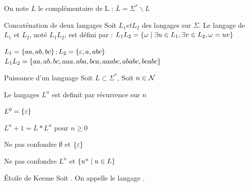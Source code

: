 \documentclass[a4paper,french,bookmarks]{book}
\begin{document}
    \begin{notation}
        On note $\overline{L}$ le complémentaire de L :
        $\overline{L} = \Sigma^* \backslash L$
    \end{notation}
    
    \begin{definition}{Concaténation de deux langages}{}
        Soit $L_1 et L_2$ des langages sur $\Sigma$.
        Le langage   de $L_1$ et $L_2$, noté $L_1 L_2$, est défini par :
        $L_1 L_2 = \left\{\omega \;\middle\vert\; \exists u \in L_1, \exists v \in L_2, \omega = uv\right\}$
    \end{definition}
    
    \begin{example}{}{}
        $L_1 = \left\{aa, ab, bc\right\} ; L_2 = \left\{\varepsilon, a, abc\right\}$
        $L_1 L_2 = \left\{aa, ab, bc, aaa, aba, bca, aaabc, ababc, bcabc\right\}$
    \end{example}
    
    \begin{definition}{Puissance d'un language }
        Soit $L \subset \Sigma^*$, Soit $n\in \mathcal{N}$  
        
        
        Le langages $L^n$ est definit par récurrence sur $n$
        \begin{enumerate}{}{}
            
            \itt $L^0 = \left\{ \varepsilon\right\}$
            
            \itt %
                $L^n+1 = L * L^n $ pour $n \geq 0$ 
                
        \end{enumerate}{}
        
    \end{definition}
    
    \begin{warning}{}{}
        \begin{enumerate}
            \itast Ne pas confondre $\emptyset$ et $\left\{\varepsilon\right\}$
            
            \itast Ne pas confondre $L^n$ et $\left\{u^n \;\middle\vert\; u \in L\right\}$
        \end{enumerate}
    \end{warning}
    
    \begin{definition}{Étoile de Keeme}{}
        Soit . On appelle  le langage .
    \end{definition}
    
\end{document}
